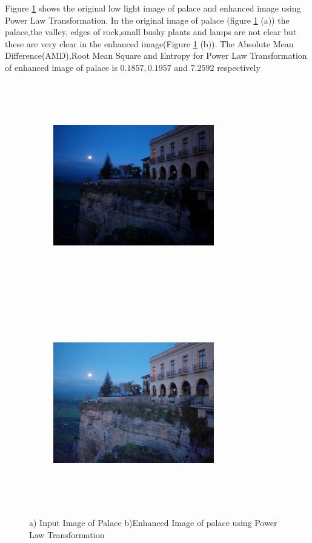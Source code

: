 Figure \ref{fig:palacePowerLaw} shows the original low light image of palace and enhanced image using Power Law Transformation. In the original image of palace (figure \ref{fig:palacePowerLaw} (a))  the palace,the valley, edges of rock,small bushy plants and lamps are not clear but these are very clear in the enhanced image(Figure \ref{fig:palacePowerLaw} (b)). The Absolute Mean Difference(AMD),Root Mean Square and Entropy for Power Law Transformation of enhanced image of palace is $0.1857, 0.1957$ and $7.2592$ respectively      

\begin{figure}[!htb]
	\begin{subfigure}{8cm}
		\centering    
    	\includegraphics[width=7cm,height=9cm,keepaspectratio]{images/ch5/palace_input.jpg}
    	\caption{} 
    \end{subfigure}
  	\begin{subfigure}{6cm}
  		\centering
  		\includegraphics[width=7cm,height=9cm,keepaspectratio]{images/ch5/palace_power.jpg}
   		\caption{}
  	\end{subfigure}
  	\caption{a) Input Image of Palace b)Enhanced Image of palace using Power Law Transformation}
  	\label{fig:palacePowerLaw}
\end{figure}

